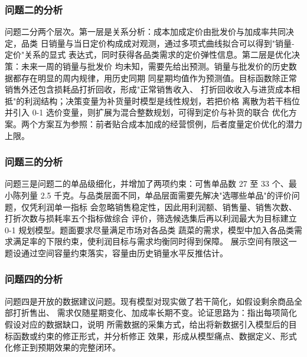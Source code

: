 \subsubsection{问题二的分析}

问题二分两个层次。第一层是关系分析：成本加成定价由批发价与加成率共同决定，品类
日销量与当日定价构成成对观测，通过多项式曲线拟合可以得到"销量-定价"关系的显式
表达式，同时获得各品类需求的定价弹性信息。第二层是优化决策：未来一周的销量与批发价
均未知，需要先给出预测。销量与批发价的历史数据都存在明显的周内规律，用历史同期
同星期均值作为预测值。目标函数除正常销售外还包含损耗品打折回收，形成"正常销售收入、
打折回收收入与进货成本相抵"的利润结构；决策变量为补货量时模型是线性规划，若把价格
离散为若干档位并引入 0-1 选价变量，则扩展为混合整数规划，可得到定价与补货的联合
优化方案。两个方案互为参照：前者贴合成本加成的经营惯例，后者度量定价优化的潜力上限。

\subsubsection{问题三的分析}

问题三是问题二的单品级细化，并增加了两项约束：可售单品数 27 至 33 个、最小陈列量
2.5 千克。与品类层面不同，单品层面需要先解决"选哪些单品"的评价问题，仅凭利润单一指标
会忽略销售稳定性，因此用利润额、销售量、销售次数、打折次数与损耗率五个指标做综合
评价，筛选候选集后再以利润最大为目标建立 0-1 规划模型。题面要求尽量满足市场对各品类
蔬菜的需求，模型中加入各品类需求满足率的下限约束，使利润目标与需求均衡同时得到保障。
展示空间有限这一题设通过空间容量约束落实，容量由历史销量水平反推估计。

\subsubsection{问题四的分析}

问题四是开放的数据建议问题。现有模型对现实做了若干简化，如假设剩余商品全部打折售出、
需求仅随星期变化、加成率长期不变。论证思路为：指出每项简化假设对应的数据缺口，说明
所需数据的采集方式，给出将新数据引入模型后的目标函数或约束的修正形式，并分析修正
效果，形成从模型痛点、数据定义、形式化修正到预期效果的完整闭环。
